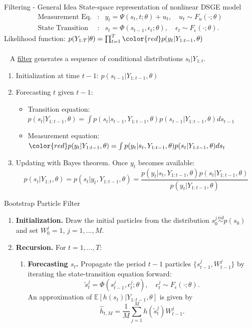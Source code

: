 \documentclass[presentation]{beamer}
\newcommand{\be}{\begin{equation}}
\newcommand{\ee}{\end{equation}}
\begin{document}
\begin{frame}[label={sec:orgb87cb22}]{Filtering - General Idea}
State-space representation of nonlinear DSGE model
\begin{eqnarray*}
\mbox{Measurement Eq.}   &:& y_t = \Psi(s_t,t; \theta) + u_t, \quad u_t \sim F_u(\cdot;\theta) \label{eq_nlssnonlinear} \\
\mbox{State Transition}  &:& s_t = \Phi(s_{t-1},\epsilon_t; \theta), \quad \epsilon_t \sim F_\epsilon(\cdot;\theta). 
\end{eqnarray*}		
Likelihood function: \(p(Y_{1:T}|\theta) = \prod_{t=1}^T {\color{red} p(y_t |Y_{1:t-1},\theta)}\)
\\~\\~  
A \uline{filter} generates a sequence of conditional distributions \(s_t|Y_{1:t}\). 
\begin{enumerate}
\item Initialization at time \(t-1\): \(p( s_{t-1} |Y_{1:t-1}, \theta )\)
\item Forecasting \(t\) given \(t-1\):
\begin{itemize}
\item Transition equation:	\(p(s_{t}|Y_{1:t-1},\theta ) = \int p(s_{t}|s_{t-1}, Y_{1:t-1} , \theta	) p (s_{t-1} |Y_{1:t-1} , \theta ) ds_{t-1}\)
\item Measurement equation: \({\color{red} p(y_{t}|Y_{1:t-1},\theta )} = \int p(y_{t}|s_{t}, Y_{1:t-1} , \theta  ) p(s_{t} | Y_{1:t-1} , \theta ) ds_{t}\)
\end{itemize}
\item Updating with Bayes theorem. Once \(y_{t}\) becomes available:
\[
      p(s_{t}| Y_{1:t} , \theta  ) = p(s_{t} | y_{t},Y_{1:t-1} , \theta )
      = \frac{ p(y_{t}|s_{t},Y_{1:t-1} , \theta ) p(s_{t} |Y_{1:t-1} , \theta )}{ p(y_{t}|Y_{1:t-1}, \theta )}
      \]
\end{enumerate}
\end{frame}




\begin{frame}[label={sec:org1e3de0a}]{Bootstrap Particle Filter}
\begin{enumerate}
	\item {\bf Initialization.} Draw the initial particles from the distribution $s_0^j \stackrel{iid}{\sim} p(s_0)$
	and set $W_0^j=1$, $j=1,\ldots,M$.

	\item {\bf Recursion.} For $t=1,\ldots,T$:
	\begin{enumerate}
		\item {\bf Forecasting $s_t$.} Propagate the period $t-1$ particles $\{ s_{t-1}^j, W_{t-1}^j \}$
		by iterating the state-transition equation forward:
		\be
		\tilde{s}_t^j = \Phi(s_{t-1}^j,\epsilon^j_t; \theta), \quad \epsilon^j_t \sim F_\epsilon(\cdot;\theta).
		\ee
		An approximation of $\mathbb{E}[h(s_t)|Y_{1:t-1},\theta]$ is given by
		\be
		\hat{h}_{t,M} = \frac{1}{M} \sum_{j=1}^M h(\tilde{s}_t^j)W_{t-1}^j.
		\label{eq_pfhtt1}
		\ee

	\end{enumerate}

\end{enumerate}
\end{frame}
\end{document}
